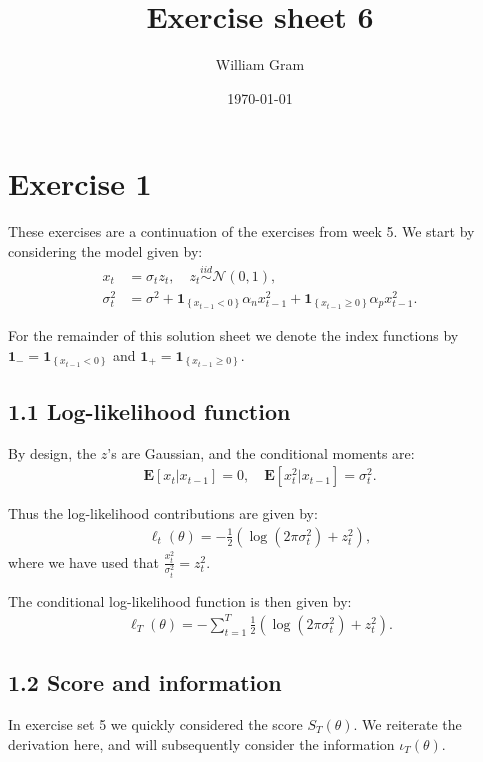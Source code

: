 \documentclass[11pt,a4paper,oneside]{article}
\title{Exercise sheet 6}
\author{William Gram}
\date{\today}
\newcommand{\lp}{\left(}
\newcommand{\rp}{\right)}
\newcommand{\rb}{\right]}
\newcommand{\lb}{\left[}
\newcommand{\lc}{\left\{}
\newcommand{\rc}{\right\}}
\newcommand{\ee}{\mathbf{E}}
\newcommand{\nnn}{\mathcal{N}}
\newcommand{\ii}{\mathbf{1}}
\newcommand{\iid}{\overset{iid}{\sim}}
\newcommand{\sumt}{\sum_{t=1}^T}
\begin{document}
\maketitle

\rfoot{\thepage}

\section{Exercise 1}
\renewcommand{\theequation}{1.\arabic{equation}}
\setcounter{equation}{0}
These exercises are a continuation of the exercises from week 5. We start by considering the model given by:
\begin{align}
    x_t &= \sigma_t z_t, \quad z_t \iid \nnn\lp 0, 1\rp,\\
    \sigma_t^2 &= \sigma^2 + \ii_{\lc x_{t-1} < 0 \rc} \alpha_n x_{t-1}^2 + \ii_{\lc x_{t-1}\geq 0\rc} \alpha_p x_{t-1}^2.
\end{align}

For the remainder of this solution sheet we denote the index functions by $\ii_- = \ii_{\lc x_{t-1} < 0\rc}$ and $\ii_+ = \ii_{\lc x_{t-1}\geq 0 \rc}$.

\subsection{1.1 Log-likelihood function}
By design, the $z$'s are Gaussian, and the conditional moments are:
\begin{align}
    \ee\lb x_t \vert x_{t-1}\rb = 0, \quad \ee\lb x_t^2 \vert x_{t-1}\rb = \sigma_t^2.
\end{align}

Thus the log-likelihood contributions are given by:
\begin{align}
    \ell_t\lp \theta \rp = - \frac{1}{2}\lp \log\lp 2 \pi \sigma_t^2\rp + z_t^2\rp,
\end{align}
where we have used that $\frac{x_t^2}{\sigma_t^2} = z_t^2$.

The conditional log-likelihood function is then given by:
\begin{align}
    \ell_T \lp \theta \rp = -\sumt \frac{1}{2}\lp \log\lp 2 \pi \sigma_t^2\rp + z_t^2\rp.
\end{align}

\subsection{1.2 Score and information}
In exercise set 5 we quickly considered the score $S_T\lp \theta\rp$. We reiterate the derivation here, and will subsequently consider the information $\iota_T\lp \theta\rp$.
\end{document}
